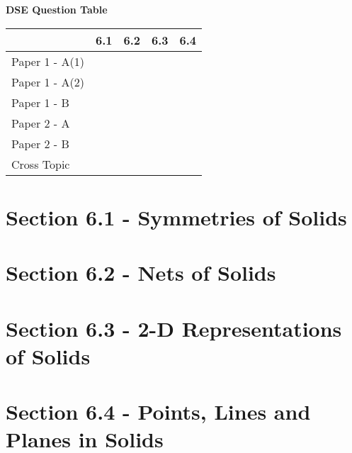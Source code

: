 \documentclass[12pt, a4paper]{article}
\begin{document}
\begin{absolutelynopagebreak}
\begin{center}
\textbf{DSE Question Table}
\end{center}
\begin{center}
\begin{tabular}{|l|c|c|c|c|}
\hline
        & 6.1 & 6.2 & 6.3 & 6.4 \\\hline
\hline
Paper 1 - A(1)&  &  &  &  \\
\hline
Paper 1 - A(2)&  &  &  &  \\
\hline
Paper 1 - B&  &  &  &  \\
\hline
\hline
Paper 2 - A&  &  &  &  \\
\hline
Paper 2 - B&  &  &  &  \\
\hline
\hline
Cross Topic&  &  &  &  \\
\hline
\end{tabular}
\end{center}
\end{absolutelynopagebreak}




\section*{Section 6.1 - Symmetries of Solids}\label{section:3-6-1}





\section*{Section 6.2 - Nets of Solids}\label{section:3-6-2}





\section*{Section 6.3 - 2-D Representations of Solids}\label{section:3-6-3}





\section*{Section 6.4 - Points, Lines and Planes in Solids}\label{section:3-6-4}
\end{document}
